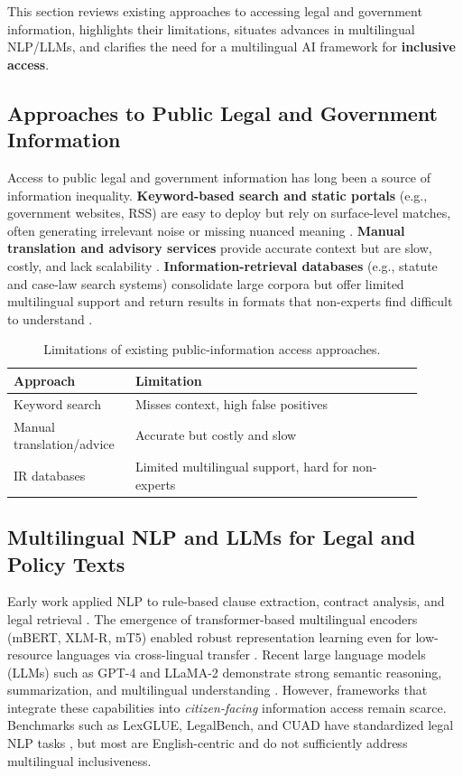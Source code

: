 {}{%
This section reviews existing approaches to accessing legal and government information, highlights their limitations, situates advances in multilingual NLP/LLMs, and clarifies the need for a multilingual AI framework for \textbf{inclusive access}.

\subsection{Approaches to Public Legal and Government Information}
Access to public legal and government information has long been a source of information inequality. \textbf{Keyword-based search and static portals} (e.g., government websites, RSS) are easy to deploy but rely on surface-level matches, often generating irrelevant noise or missing nuanced meaning \cite{zhong2020legalai}. \textbf{Manual translation and advisory services} provide accurate context but are slow, costly, and lack scalability \cite{aletras2016echr}. \textbf{Information-retrieval databases} (e.g., statute and case-law search systems) consolidate large corpora but offer limited multilingual support and return results in formats that non-experts find difficult to understand \cite{niklaus2023multilegal}.

\begin{table}[h]
\centering
\small
\begin{tabular}{p{0.25\linewidth}p{0.65\linewidth}}
\toprule
Approach & Limitation \\
\midrule
Keyword search & Misses context, high false positives \\
Manual translation/advice & Accurate but costly and slow \\
IR databases & Limited multilingual support, hard for non-experts \\
\bottomrule
\end{tabular}
\caption{Limitations of existing public-information access approaches.}
\end{table}

\subsection{Multilingual NLP and LLMs for Legal and Policy Texts}
Early work applied NLP to rule-based clause extraction, contract analysis, and legal retrieval \cite{chalkidis2020legalbert}. The emergence of transformer-based multilingual encoders (mBERT, XLM-R, mT5) enabled robust representation learning even for low-resource languages via cross-lingual transfer \cite{devlin2019bert, conneau2020xlmr, xue2021mt5}. Recent large language models (LLMs) such as GPT-4 and LLaMA-2 demonstrate strong semantic reasoning, summarization, and multilingual understanding \cite{openai2023gpt4, touvron2023llama2}. However, frameworks that integrate these capabilities into \emph{citizen-facing} information access remain scarce. Benchmarks such as LexGLUE, LegalBench, and CUAD have standardized legal NLP tasks \cite{chalkidis2022lexglue, guha2023legalbench, hendrycks2021cuad}, but most are English-centric and do not sufficiently address multilingual inclusiveness.

}
